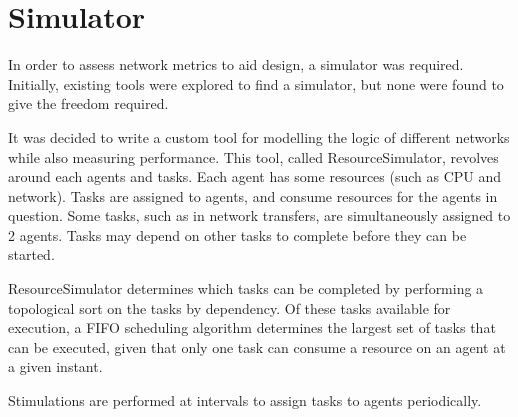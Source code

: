 \section{Simulator}
	\label{simulator}
	In order to assess network metrics to aid design, a simulator was required. Initially, existing tools were explored to find a simulator, but none were found to give the freedom required.
	
	It was decided to write a custom tool for modelling the logic of different networks while also measuring performance. This tool, called ResourceSimulator, revolves around each agents and tasks. Each agent has some resources (such as CPU and network). Tasks are assigned to agents, and consume resources for the agents in question. Some tasks, such as in network transfers, are simultaneously assigned to 2 agents. Tasks may depend on other tasks to complete before they can be started. 
	
	ResourceSimulator determines which tasks can be completed by performing a topological sort on the tasks by dependency. Of these tasks available for execution, a FIFO scheduling algorithm determines the largest set of tasks that can be executed, given that only one task can consume a resource on an agent at a given instant.
	
	Stimulations are performed at intervals to assign tasks to agents periodically.